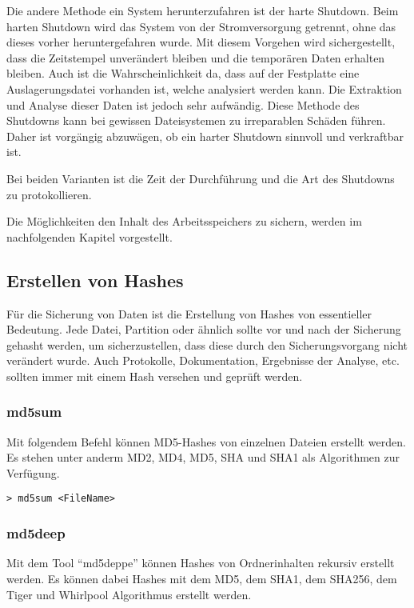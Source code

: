 Die andere Methode ein System herunterzufahren ist der harte Shutdown. Beim harten Shutdown wird das System von der Stromversorgung getrennt, ohne das dieses vorher heruntergefahren wurde. Mit diesem Vorgehen wird sichergestellt, dass die Zeitstempel unverändert bleiben und die temporären Daten erhalten bleiben. Auch ist die Wahrscheinlichkeit da, dass auf der Festplatte eine Auslagerungsdatei vorhanden ist, welche analysiert werden kann. Die Extraktion und Analyse dieser Daten ist jedoch sehr aufwändig. Diese Methode des Shutdowns kann bei gewissen Dateisystemen zu irreparablen Schäden führen. Daher ist vorgängig abzuwägen, ob ein harter Shutdown sinnvoll und verkraftbar ist.

Bei beiden Varianten ist die Zeit der Durchführung und die Art des Shutdowns zu protokollieren.

Die Möglichkeiten den Inhalt des Arbeitsspeichers zu sichern, werden im nachfolgenden Kapitel vorgestellt.



\subsection{Erstellen von Hashes} \label{subsec:ToolsTechniques:Secure:Hash}
Für die Sicherung von Daten ist die Erstellung von Hashes von essentieller Bedeutung. Jede Datei, Partition oder ähnlich sollte vor und nach der Sicherung gehasht werden, um sicherzustellen, dass diese durch den Sicherungsvorgang nicht verändert wurde. Auch Protokolle, Dokumentation, Ergebnisse der Analyse, etc. sollten immer mit einem Hash versehen und geprüft werden.

\subsubsection{md5sum}
Mit folgendem Befehl können MD5-Hashes von einzelnen Dateien erstellt werden. Es stehen unter anderm MD2, MD4, MD5, SHA und SHA1 als Algorithmen zur Verfügung.

\begin{lstlisting}
> md5sum <FileName>
\end{lstlisting}

\subsubsection{md5deep}
Mit dem Tool "`md5deppe"' können Hashes von Ordnerinhalten rekursiv erstellt werden. Es können dabei Hashes mit dem MD5, dem SHA1, dem SHA256, dem Tiger und Whirlpool Algorithmus erstellt werden.

